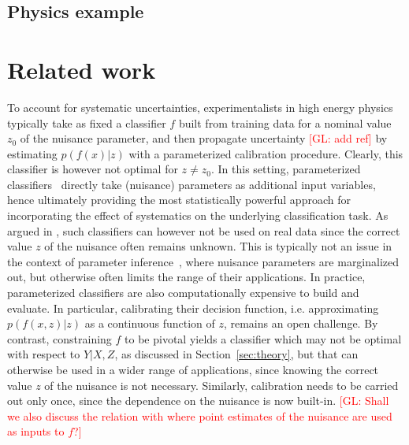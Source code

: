 \documentclass[twocolumn,superscriptaddress,aps]{revtex4-1}
\newcommand{\glnote}[1]{\textcolor{red}{[GL: #1]}}
\theoremstyle{plain}
\begin{document}
\subsection{Physics example}



\section{Related work}

To account for systematic uncertainties, experimentalists in high energy physics
typically take as fixed a classifier $f$ built from training data for a nominal
value $z_0$ of the nuisance parameter, and then propagate uncertainty
\glnote{add ref} by estimating $p(f(x)|z)$ with a parameterized calibration
procedure. Clearly, this classifier is however not optimal for $z \neq z_0$. In
this setting, parameterized
classifiers~\citep{cranmer2015approximating,Baldi:2016fzo} directly take
(nuisance) parameters as additional input variables, hence ultimately providing
the most statistically powerful approach for incorporating the effect of
systematics on the underlying classification task.  As argued in
\citep{Neal:2007zz}, such classifiers can however not be used on real data since
the correct value $z$ of the nuisance often remains unknown. This is typically
not an issue in the context of parameter
inference~\citep{cranmer2015approximating}, where nuisance parameters are
marginalized out, but otherwise often limits the range of their applications. In
practice, parameterized classifiers  are also computationally expensive to build
and evaluate. In particular, calibrating their decision function, i.e.
approximating $p(f(x,z)|z)$ as a continuous function of $z$, remains an open
challenge. By contrast, constraining $f$ to be pivotal yields a classifier which
may not be optimal with respect to $Y|X,Z$, as discussed in
Section~\ref{sec:theory}, but that can otherwise be used in a wider range of
applications, since knowing the correct value $z$ of the nuisance is not
necessary. Similarly, calibration needs to be carried out only once, since  the
dependence on the nuisance is now built-in. \glnote{Shall we also discuss the
relation with \citep{Neal:2007zz} where point estimates of the nuisance are used
as inputs to $f$?}
\end{document}
